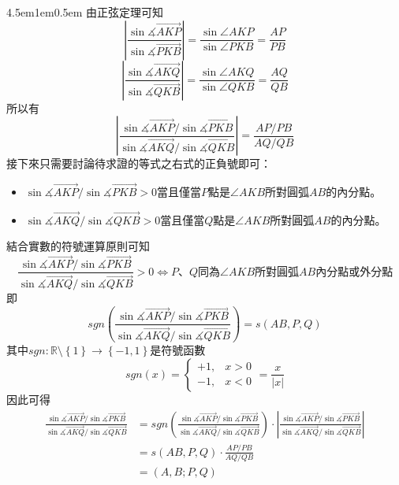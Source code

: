 \documentclass[12pt]{article}
\begin{document}
\begin{mybox}{4.5em}{1em}{0.5em}
    由正弦定理可知
    $$
        \left|\frac{\sin{\measuredangle{\overrightarrow{AKP}}}}{\sin{\measuredangle{\overrightarrow{PKB}}}}\right|=\frac{\sin{\angle{AKP}}}{\sin{\angle{PKB}}}=\frac{AP}{PB}
    $$
    $$
        \left|\frac{\sin{\measuredangle{\overrightarrow{AKQ}}}}{\sin{\measuredangle{\overrightarrow{QKB}}}}\right|=\frac{\sin{\angle{AKQ}}}{\sin{\angle{QKB}}}=\frac{AQ}{QB}
    $$
    所以有
    $$
        \left|\frac{\sin{\measuredangle{\overrightarrow{AKP}}}/\sin{\measuredangle{\overrightarrow{PKB}}}}{\sin{\measuredangle{\overrightarrow{AKQ}}}/\sin{\measuredangle{\overrightarrow{QKB}}}}\right|=\frac{AP/PB}{AQ/QB}
    $$
    接下來只需要討論待求證的等式之右式的正負號即可：
    \begin{itemize}
        \item $\sin{\measuredangle{\overrightarrow{AKP}}}/\sin{\measuredangle{\overrightarrow{PKB}}}>0$當且僅當$P$點是$\angle{AKB}$所對圓弧$AB$的內分點。
        \item $\sin{\measuredangle{\overrightarrow{AKQ}}}/\sin{\measuredangle{\overrightarrow{QKB}}}>0$當且僅當$Q$點是$\angle{AKB}$所對圓弧$AB$的內分點。
    \end{itemize}
    結合實數的符號運算原則可知
    $$
        \frac{\sin{\measuredangle{\overrightarrow{AKP}}}/\sin{\measuredangle{\overrightarrow{PKB}}}}{\sin{\measuredangle{\overrightarrow{AKQ}}}/\sin{\measuredangle{\overrightarrow{QKB}}}}>0\Leftrightarrow P\text{、}Q\text{同為}\angle{AKB}\text{所對圓弧}AB\text{內分點或外分點}
    $$
    即
    $$
        sgn\left(\frac{\sin{\measuredangle{\overrightarrow{AKP}}}/\sin{\measuredangle{\overrightarrow{PKB}}}}{\sin{\measuredangle{\overrightarrow{AKQ}}}/\sin{\measuredangle{\overrightarrow{QKB}}}}\right)=s\left(AB,P,Q\right)
    $$
    其中$sgn:\mathbb{R}\setminus\left\{1\right\}\rightarrow\left\{-1,1\right\}$是符號函數
    $$
        sgn(x)=\left\{\begin{matrix}
            +1,&x>0\\
            -1,&x<0
        \end{matrix}\right.=\frac{x}{\left|x\right|}
    $$
    因此可得
    \begin{align*}
        \frac{\sin{\measuredangle{\overrightarrow{AKP}}}/\sin{\measuredangle{\overrightarrow{PKB}}}}{\sin{\measuredangle{\overrightarrow{AKQ}}}/\sin{\measuredangle{\overrightarrow{QKB}}}}&=
        sgn\left(\frac{\sin{\measuredangle{\overrightarrow{AKP}}}/\sin{\measuredangle{\overrightarrow{PKB}}}}{\sin{\measuredangle{\overrightarrow{AKQ}}}/\sin{\measuredangle{\overrightarrow{QKB}}}}\right)\cdot\left|\frac{\sin{\measuredangle{\overrightarrow{AKP}}}/\sin{\measuredangle{\overrightarrow{PKB}}}}{\sin{\measuredangle{\overrightarrow{AKQ}}}/\sin{\measuredangle{\overrightarrow{QKB}}}}\right|\\
        &=s\left(AB,P,Q\right)\cdot\frac{AP/PB}{AQ/QB}\\
        &=\left(A,B;P,Q\right)
    \end{align*}
\end{mybox}
\end{document}
